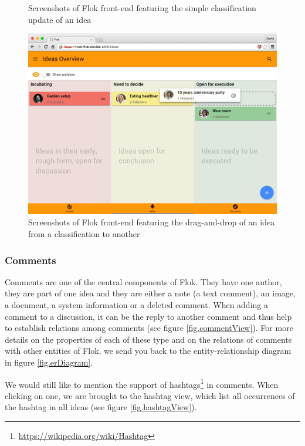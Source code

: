 \documentclass[a4paper,12pt,twoside]{article}
\begin{document}
\begin{figure}[!htb]
\begin{subfigure}{.48\textwidth}
    \end{subfigure}
    \caption{Screenshots of Flok front-end featuring the simple classification update of an idea}
    \label{fig.classificationSelect}
\end{figure}

\begin{figure}[!htb]
    \centering
    \includegraphics[width=\textwidth]{images/classificationDragAndDrop.png}
    \caption{Screenshots of Flok front-end featuring the drag-and-drop of an idea from a classification to another}
    \label{fig.classificationDragAndDrop}
\end{figure}

\FloatBarrier
\subsubsection{Comments}
\label{sec.comments}
Comments are one of the central components of Flok.
They have one author, they are part of one idea and they are either a note (a text comment), an image, a document, a system information or a deleted comment.
When adding a comment to a discussion, it can be the reply to another comment and thus help to establish relations among comments (see figure \ref{fig.commentView}).
For more details on the properties of each of these type and on the relations of comments with other entities of Flok, we send you back to the entity-relationship diagram in figure \ref{fig.erDiagram}.

We would still like to mention the support of hashtags\footnote{\url{https://wikipedia.org/wiki/Hashtag}} in comments.
When clicking on one, we are brought to the hashtag view, which list all occurrences of the hashtag in all ideas (see figure \ref{fig.hashtagView}).
\end{document}
